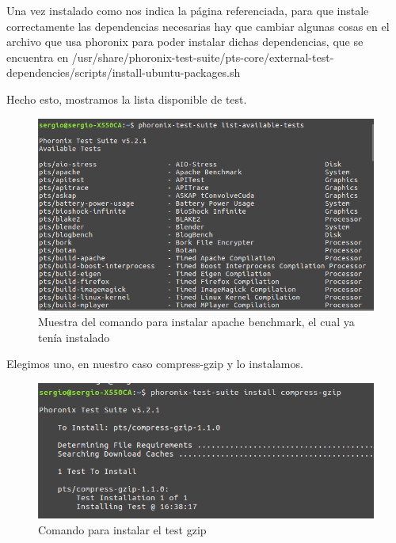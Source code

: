 Una vez instalado como nos indica la página referenciada, para que instale correctamente las dependencias necesarias hay que cambiar algunas cosas en el archivo que usa phoronix para poder instalar dichas dependencias, que se encuentra en /usr/share/phoronix-test-suite/pts-core/external-test-dependencies/scripts/install-ubuntu-packages.sh  \cite{phoronix}

Hecho esto, mostramos la lista disponible de test.

\begin{figure}[H] %
	\centering
	\includegraphics[scale=0.5]{imagenes/list-test.png}  %
	\caption{Muestra del comando para instalar apache benchmark, el cual ya tenía instalado}
\end{figure}

Elegimos uno, en nuestro caso compress-gzip y lo instalamos.

\begin{figure}[H] %
	\centering
	\includegraphics[scale=0.5]{imagenes/install-gzip.png}  %
	\caption{Comando para instalar el test gzip}
\end{figure}

